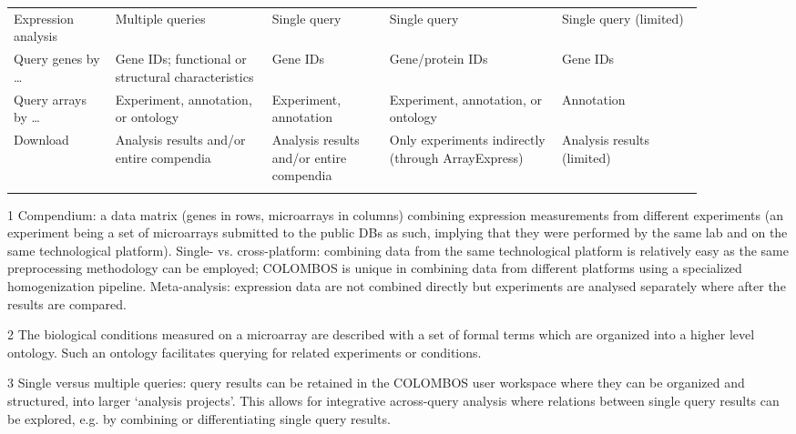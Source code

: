 \begin{sidewaystable}
\begin{threeparttable}
\begin{small}
\begin{tabular}{ @{}|>{\raggedright}p{0.13\linewidth} 
	>{\raggedright}p{0.2\linewidth} >{\raggedright}p{0.15\linewidth} 
	>{\raggedright}p{0.22\linewidth} >{\raggedright}p{0.18\linewidth}|@{}}
		\arrayrulecolor{Black}
		\multicolumn{5}{|l|}{\bf Functionalities}
		\tabularnewline
		\hline
		Expression analysis\tnote{3} & Multiple queries & Single query & Single 
		query & Single query (limited) \tabularnewline[1ex] 
		\arrayrulecolor{Gray}\hline
		Query genes by \ldots & Gene IDs; functional or structural 
		characteristics & Gene IDs & Gene/protein IDs & Gene IDs 
		\tabularnewline[1ex] 
		\arrayrulecolor{Gray}\hline	
		Query arrays by \ldots & Experiment, annotation, or ontology & 
		Experiment, annotation & Experiment, annotation, or ontology & 
		Annotation \tabularnewline[1ex] 
		\arrayrulecolor{Gray}\hline
		Download & Analysis results and/or entire compendia & Analysis results 
		and/or entire compendia & Only experiments indirectly (through 
		ArrayExpress) & Analysis results (limited) \tabularnewline
		\arrayrulecolor{Black}\bottomrule 
	\end{tabular}
	\end{small}
	\begin{tiny}
	\begin{tablenotes}
		\item[1] Compendium: a data matrix (genes in rows, microarrays in 
		columns) combining expression measurements from different experiments 
		(an experiment being a set of microarrays submitted to the public DBs 
		as such, implying that they were performed by the same lab and on the 
		same technological platform). Single- vs. cross-platform: combining 
		data from the same technological platform is relatively easy as the 
		same preprocessing methodology can be employed; COLOMBOS is unique in 
		combining data from different platforms using a specialized 
		homogenization pipeline. Meta-analysis: expression data are not 
		combined directly but experiments are analysed separately where after 
		the results are compared.
		\item[2] The biological conditions measured on a microarray are 
		described with a set of formal terms which are organized into a higher 
		level ontology. Such an ontology facilitates querying for related 
		experiments or conditions.
		\item[3] Single versus multiple queries: query results can be retained 
		in the COLOMBOS user workspace where they can be organized and 
		structured, into larger `analysis projects'. This allows for 
		integrative across-query analysis where relations between single query 
		results can be explored, e.g. by combining or differentiating single 
		query results.
	\end{tablenotes}
	\end{tiny}
	\end{threeparttable}
\end{sidewaystable}



